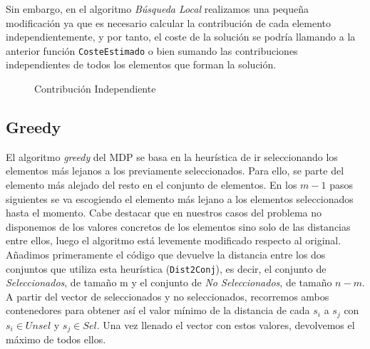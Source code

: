 \newpage
Sin embargo, en el algoritmo \textit{Búsqueda Local} realizamos una pequeña modificación ya que es necesario calcular la contribución de cada elemento independientemente, y por tanto, el coste de la solución se podría llamando a la anterior función \texttt{CosteEstimado} o bien sumando las contribuciones independientes de todos los elementos que forman la solución.

\begin{figure}[H]
	\centering
	\begin{minipage}{.9\linewidth}
		
		
		
		\begin{algorithm}[H] 
			
			\caption{Contribución Independiente}
			\SetAlgoLined
			
			
			
		\end{algorithm} 
		
	\end{minipage}
\end{figure}









\subsection{Greedy}
\hspace{1.5cm} El algoritmo \textit{greedy} del MDP se basa en la heurística de ir seleccionando los elementos más lejanos a los previamente seleccionados. Para ello, se parte del elemento más alejado del resto en el conjunto de elementos. En los $m-1$ pasos siguientes se va escogiendo el elemento más lejano a los elementos seleccionados hasta el momento. Cabe destacar que en nuestros casos del problema no disponemos de los valores concretos de los elementos sino solo de las distancias entre ellos, luego el algoritmo está levemente modificado respecto al original.  \\

Añadimos primeramente el código que devuelve la distancia entre los dos conjuntos que utiliza esta heurística (\texttt{Dist2Conj}), es decir, el conjunto de \textit{Seleccionados}, de tamaño m y el conjunto de \textit{No Seleccionados}, de tamaño $n-m$.
A partir del vector de seleccionados y no seleccionados, recorremos ambos contenedores para obtener así el valor mínimo de la distancia de cada $s_i$ a $s_j$ con $s_i \in Unsel$ y  $s_j \in Sel$. Una vez llenado el vector con estos valores, devolvemos el máximo de todos ellos. \\




